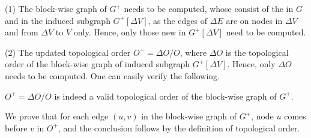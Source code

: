 

\sstab(1) The block-wise graph of $G^+$ needs to be computed, whose \sccs consist of the \sccs in $G$ and \sccs in the induced subgraph $G^+[\Delta V]$, as  the edges of $\Delta E$ are  on nodes in $\Delta V$ and from $\Delta V$  to $V$ only. Hence, only those new \sccs in $G^+[\Delta V]$ need to be computed.

\sstab(2) The updated topological order $O^+=\Delta O/O$, where $\Delta O$ is the topological order of the block-wise graph of induced subgraph $G^+[\Delta V]$. Hence, only $\Delta O$ needs to be computed. One can easily verify the following.


\begin{prop} \label{lemma-inc-topo}
 $O^+=\Delta O/O$ is indeed a valid topological order of the block-wise graph of $G^+$.
\end{prop}

\begin{proofSketch}
We prove that for each edge $(u,v)$ in the block-wise graph of $G^+$, node $u$ comes before $v$ in $O^+$, and the conclusion follows by the definition of topological order.
\end{proofSketch}



